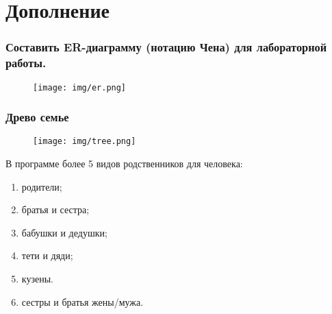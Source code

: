 \chapter {Дополнение}

\subsection*{Составить ER-диаграмму (нотацию Чена) для лабораторной работы.}

\begin{figure}[h]
	\centering
	\texttt{[image: img/er.png]}
	\label{fig:er}
\end{figure}

\subsection*{Древо семье}

\begin{figure}[h]
	\centering
	\texttt{[image: img/tree.png]}
	\label{fig:tree}
\end{figure}

В программе более 5 видов родственников для человека:
\begin{enumerate}
	\item родители;
	\item братья и сестра;
	\item бабушки и дедушки;
	\item тети и дяди;
	\item кузены.
	\item сестры и братья жены/мужа.
\end{enumerate}


